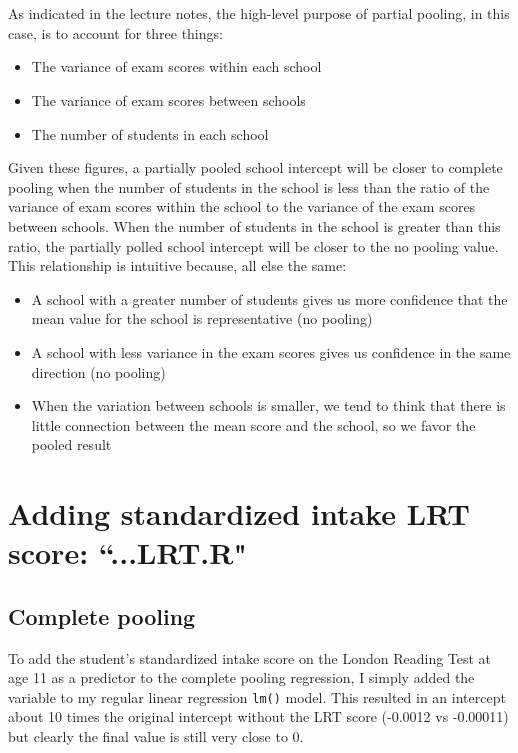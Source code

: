 \documentclass{article}
\begin{document}
\section{}
As indicated in the lecture notes, the high-level purpose of partial pooling, in this case, is to account for three things:
\begin{itemize}
\item The variance of exam scores within each school
\item The variance of exam scores between schools
\item The number of students in each school
\end{itemize}

Given these figures, a partially pooled school intercept will be closer to complete pooling when the number of students in the school is less than the ratio of the variance of exam scores within the school to the variance of the exam scores between schools. When the number of students in the school is greater than this ratio, the partially polled school intercept will be closer to the no pooling value. This relationship is intuitive because, all else the same:
\begin{itemize}
\item A school with a greater number of students gives us more confidence that the mean value for the school is representative (no pooling)
\item A school with less variance in the exam scores gives us confidence in the same direction (no pooling)
\item When the variation between schools is smaller, we tend to think that there is little connection between the mean score and the school, so we favor the pooled result
\end{itemize}

\section{Adding standardized intake LRT score: ``...LRT.R"}
\subsection{Complete pooling}
To add the student’s standardized intake score on the London Reading Test at age 11 as a predictor to the complete pooling regression, I simply added the variable to my regular linear regression \verb|lm()| model. This resulted in an intercept about 10 times the original intercept without the LRT score (-0.0012 vs -0.00011) but clearly the final value is still very close to $0$.
\end{document}
